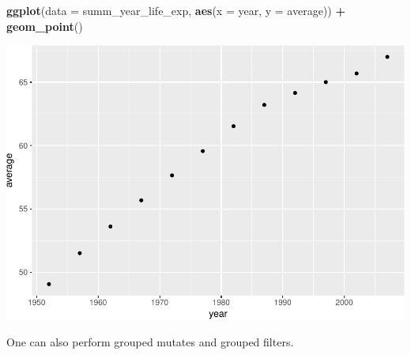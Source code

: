 \documentclass[11pt,]{article}
\newenvironment{Shaded}{\begin{snugshade}}{\end{snugshade}}
\newcommand{\KeywordTok}[1]{\textcolor[rgb]{0.13,0.29,0.53}{\textbf{#1}}}
\newcommand{\DataTypeTok}[1]{\textcolor[rgb]{0.13,0.29,0.53}{#1}}
\newcommand{\StringTok}[1]{\textcolor[rgb]{0.31,0.60,0.02}{#1}}
\newcommand{\OperatorTok}[1]{\textcolor[rgb]{0.81,0.36,0.00}{\textbf{#1}}}
\newcommand{\NormalTok}[1]{#1}
\begin{document}
\begin{Shaded}
\begin{Highlighting}[]
\KeywordTok{ggplot}\NormalTok{(}\DataTypeTok{data =}\NormalTok{ summ_year_life_exp, }
       \KeywordTok{aes}\NormalTok{(}\DataTypeTok{x =}\NormalTok{ year, }\DataTypeTok{y =}\NormalTok{ average)) }\OperatorTok{+}\StringTok{ }
\StringTok{  }\KeywordTok{geom_point}\NormalTok{()}
\end{Highlighting}
\end{Shaded}

\includegraphics{Intro_data_wrangling_files/figure-latex/summ_cont-2.pdf}

One can also perform grouped mutates and grouped filters.
\end{document}
